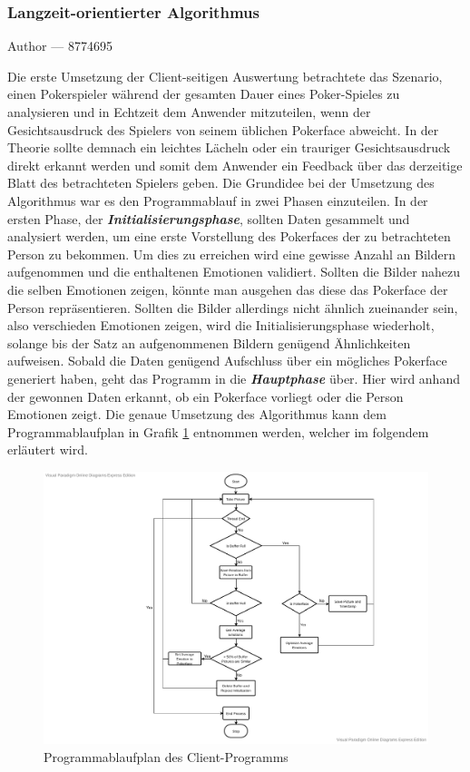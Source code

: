 \documentclass[12pt, a4paper]{report}
\makeatletter
\newcommand{\sectionauthor}[1]{%
  {\parindent0pt\vspace*{-5pt}%
  \large{Author --- }
  \linespread{1.1}\large\scshape#1%
  \par\nobreak\vspace*{35pt} }
  \@afterheading%
}
\makeatother
\begin{document}
\subsubsection{Langzeit-orientierter Algorithmus}
\sectionauthor{8774695}
Die erste Umsetzung der Client-seitigen Auswertung betrachtete das Szenario, einen Pokerspieler während der gesamten Dauer eines Poker-Spieles zu analysieren und in Echtzeit dem Anwender mitzuteilen, wenn der Gesichtsausdruck des Spielers von seinem üblichen Pokerface abweicht. In der Theorie sollte demnach ein leichtes Lächeln oder ein trauriger Gesichtsausdruck direkt erkannt werden und somit dem Anwender ein Feedback über das derzeitige Blatt des betrachteten Spielers geben.
Die Grundidee bei der Umsetzung des Algorithmus war es den Programmablauf in zwei Phasen einzuteilen. In der ersten Phase, der  \textit{\textbf{Initialisierungsphase}}, sollten Daten gesammelt und analysiert werden, um eine erste Vorstellung des Pokerfaces der zu betrachteten Person zu bekommen. Um dies zu erreichen wird eine gewisse Anzahl an Bildern aufgenommen und die enthaltenen Emotionen validiert. Sollten die Bilder nahezu die selben Emotionen zeigen, könnte man ausgehen das diese das Pokerface der Person repräsentieren. Sollten die Bilder allerdings nicht ähnlich zueinander sein, also verschieden Emotionen zeigen, wird die Initialisierungsphase wiederholt, solange bis der Satz an aufgenommenen Bildern genügend Ähnlichkeiten aufweisen.
 Sobald die Daten genügend Aufschluss über ein mögliches Pokerface generiert haben, geht das Programm in die  \textit{\textbf{Hauptphase}} über. Hier wird anhand der gewonnen Daten erkannt, ob ein Pokerface vorliegt oder die Person Emotionen zeigt.
Die genaue Umsetzung des Algorithmus kann dem Programmablaufplan in Grafik \ref{fig:flowchart} entnommen werden, welcher im folgendem erläutert wird.

\begin{figure}[H]
\includegraphics[width=\linewidth]{Bilder/ClientDataflow.pdf}
\caption{Programmablaufplan des Client-Programms}
\label{fig:flowchart}
\end{figure}
\end{document}
